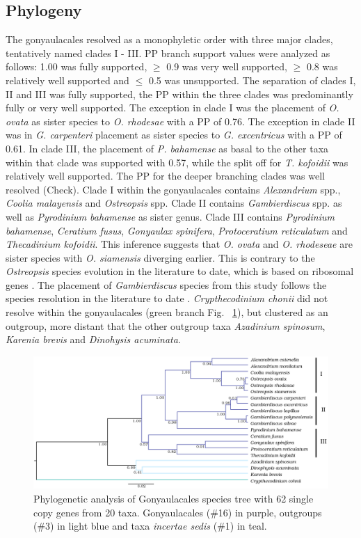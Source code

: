 \documentclass[12pt]{article}
\begin{document}
\subsection*{Phylogeny}
The gonyaulacales resolved as a monophyletic order with three major clades, tentatively named clades I - III. 
PP branch support values were analyzed as follows: 1.00 was fully supported, $\geq$ 0.9 was very well supported, $\geq$ 0.8 was relatively well supported and $\leq$ 0.5 was unsupported.
The separation of clades I, II and III was fully supported, the PP within the three clades was predominantly fully or very well supported. 
The exception in clade I was the placement of \emph{O. ovata} as sister species to \emph{O. rhodesae} with a PP of 0.76. 
The exception in clade II was in \emph{G. carpenteri} placement as sister species to \emph{G. excentricus} with a PP of 0.61. In clade III, the placement of \emph{P. bahamense} as basal to the other taxa within that clade was supported with 0.57, while the split off for \emph{T. kofoidii} was relatively well supported.
The PP for the deeper branching clades was well resolved (Check). %
Clade I within the gonyaulacales contains \emph{Alexandrium} spp., \emph{Coolia malayensis} and \emph{Ostreopsis} spp. 
Clade II contains \emph{Gambierdiscus} spp. as well as \emph{Pyrodinium bahamense} as sister genus. 
Clade III contains \emph{Pyrodinium bahamense}, \emph{Ceratium fusus}, \emph{Gonyaulax spinifera}, \emph{Protoceratium reticulatum} and \emph{Thecadinium kofoidii}. 
This inference suggests that \emph{O. ovata} and \emph{O. rhodeseae} are sister species with \emph{O. siamensis} diverging earlier. 
This is contrary to the \emph{Ostreopsis} species evolution in the literature to date, which is based on ribosomal genes \cite{verma2016molecular}. 
The placement of \emph{Gambierdiscus} species from this study follows the species resolution in the literature to date \cite{kretzschmar2017characterization}. 
\emph{Crypthecodinium chonii} did not resolve within the gonyaulacales (green branch Fig. ~\ref{fig:phylo}), but clustered as an outgroup, more distant that the other outgroup taxa \emph{Azadinium spinosum}, \emph{Karenia brevis} and \emph{Dinohysis acuminata}.
\FloatBarrier 
\begin{figure} 
\includegraphics[scale=.25]{Aug2_20-taxa-combined-fig_MCC_trees_gimp.png} 
\caption{Phylogenetic analysis of Gonyaulacales species tree with 62 single copy genes from 20 taxa. Gonyaulacales (\#16) in purple, outgroups (\#3) in light blue and taxa \textit{incertae sedis} (\#1) in teal.} 
\label{fig:phylo}
\end{figure} 
\FloatBarrier
\end{document}
